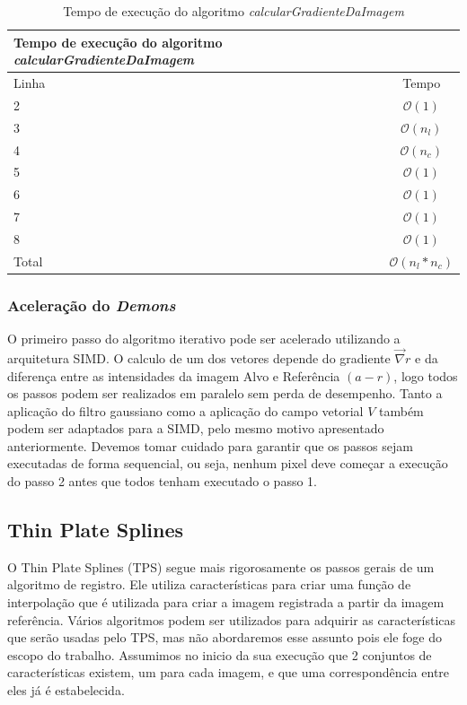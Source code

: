 \begin{table}[H]
\begin{center}
\begin{tabular}{l|c}
\hline
Tempo de execução do algoritmo \textit{calcularGradienteDaImagem} \\
\hline
Linha&Tempo\\
\hline
2       &$\mathcal{O}(1)$ \\
3       &$\mathcal{O}(n_l)$ \\
4       &$\mathcal{O}(n_c)$\\
5       &$\mathcal{O}(1)$\\
6       &$\mathcal{O}(1)$\\
7       &$\mathcal{O}(1)$\\
8       &$\mathcal{O}(1)$\\
\hline
Total   &$\mathcal{O}(n_l*n_c)$\\
\hline
\end{tabular}
\caption{Tempo de execução do algoritmo \textit{calcularGradienteDaImagem}}
\label{table:interpolar}
\end{center}
\end{table}

\subsubsection{Aceleração do \textit{Demons}}
    O primeiro passo do algoritmo iterativo pode ser acelerado utilizando a arquitetura SIMD. O calculo de um dos vetores
depende do gradiente $\vec{\nabla}r$ e da diferença entre as intensidades da imagem Alvo e Referência $(a - r)$, logo
todos os passos podem ser realizados em paralelo sem perda de desempenho. Tanto a aplicação do filtro gaussiano como
a aplicação do campo vetorial $V$ também podem ser adaptados para a SIMD, pelo mesmo motivo apresentado anteriormente.
Devemos tomar cuidado para garantir que os passos sejam executadas de forma sequencial, ou seja, nenhum pixel deve começar
a execução do passo 2 antes que todos tenham executado o passo 1.

\subsection{Thin Plate Splines}
    O Thin Plate Splines (TPS) segue mais rigorosamente os passos gerais de um algoritmo de registro. Ele utiliza
características para criar uma função de interpolação que é utilizada para criar a imagem registrada a partir
da imagem referência. Vários algoritmos podem ser utilizados para adquirir as características que serão usadas
pelo TPS, mas não abordaremos esse assunto pois ele foge do escopo do trabalho. Assumimos no inicio da sua
execução que 2 conjuntos de características existem, um para cada imagem, e que uma correspondência entre
eles já é estabelecida.

